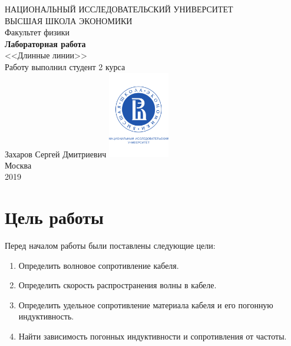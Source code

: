 \documentclass[a4paper, 12pt]{article}
\begin{document}
	\begin{titlepage}
		\begin{center}
			$$$$
			$$$$
			$$$$
			$$$$
			{\Large{НАЦИОНАЛЬНЫЙ ИССЛЕДОВАТЕЛЬСКИЙ УНИВЕРСИТЕТ}}\\
			\vspace{0.1cm}
			{\Large{ВЫСШАЯ ШКОЛА ЭКОНОМИКИ}}\\
			\vspace{0.25cm}
			{\large{Факультет физики}}\\
			\vspace{5.5cm}
			{\Huge\textbf{{Лабораторная работа}}}\\%
			\vspace{1cm}
			{\LARGE{<<Длинные линии>>}}\\%
			\vspace{2cm}
			{Работу выполнил студент 2 курса}\\
			{Захаров Сергей Дмитриевич}
			\vfill
			\includegraphics[width = 0.2\textwidth]{HSElogo}\\
			\vfill
			Москва\\
			2019
		\end{center}
	\end{titlepage}

\tableofcontents

\newpage

\section{Цель работы}

Перед началом работы были поставлены следующие цели:

\begin{enumerate}
	\item Определить волновое сопротивление кабеля.
	
	\item Определить скорость распространения волны в кабеле.
	
	\item  %
	Определить удельное сопротивление материала кабеля и его погонную индуктивность.
	
	\item Найти зависимость погонных индуктивности и сопротивления от частоты. 
\end{enumerate}
\end{document}
